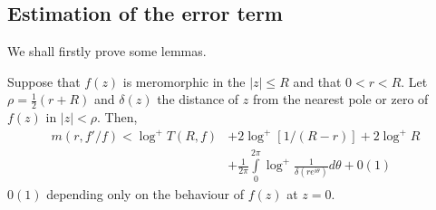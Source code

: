 \subsection{Estimation of the error term}\label{part2-sec2.2}

We shall firstly prove some lemmas.

\setcounter{lem}{0}
\begin{lem}\label{part2-lem1}
Suppose that $f(z)$ is meromorphic in the $|z|\leq R$ and that
$0<r<R$. Let $\rho=\frac{1}{2}(r+R)$ and $\delta(z)$ the distance of
$z$ from the nearest pole or zero of $f(z)$ in $|z|<\rho$. Then,
\begin{align*}
m(r,f'/f)<\log^{+}T(R,f) &+ 2\log^{+}[1/(R-r)]+2\log^{+}R\\
&+ \frac{1}{2\pi}
\int\limits^{2\pi}_{0}\log^{+}\frac{1}{\delta(re^{i\theta})}d\theta+0(1) 
\end{align*}
$0(1)$ depending only on the behaviour of $f(z)$ at $z=0$.
\end{lem}

